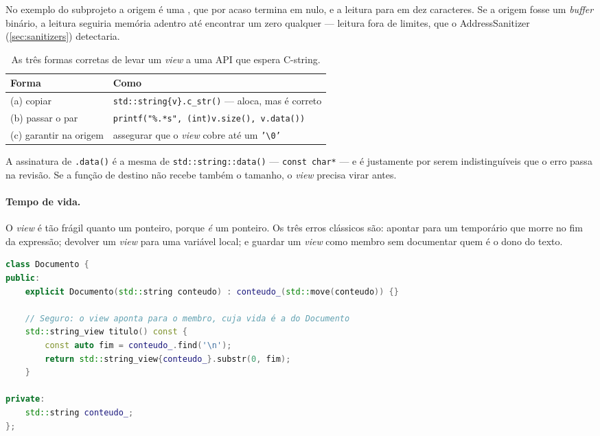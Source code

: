 No exemplo do subprojeto a origem é uma , que por acaso
termina em nulo, e a leitura para em dez caracteres. Se a origem fosse um
\emph{buffer} binário, a leitura seguiria memória adentro até encontrar um zero
qualquer --- leitura fora de limites, que o AddressSanitizer
(\cref{sec:sanitizers}) detectaria.

\begin{table}[htbp]
\centering
\caption{As três formas corretas de levar um \emph{view} a uma API que espera
         C-string.}
\label{tab:view-c-api}
\footnotesize
\begin{tabular}{@{}ll@{}}
\toprule
\textbf{Forma} & \textbf{Como} \\
\midrule
(a) copiar        & \texttt{std::string\{v\}.c\_str()} --- aloca, mas é correto \\
(b) passar o par  & \texttt{printf("\%.*s", (int)v.size(), v.data())} \\
(c) garantir na origem & assegurar que o \emph{view} cobre até um
                         \texttt{'\textbackslash 0'} \\
\bottomrule
\end{tabular}
\end{table}

\begin{regra}
A assinatura de \texttt{.data()} é a mesma de \texttt{std::string::data()} ---
\texttt{const char*} --- e é justamente por serem indistinguíveis que o erro
passa na revisão. Se a função de destino não recebe também o tamanho, o
\emph{view} precisa virar  antes.
\end{regra}

\paragraph{Tempo de vida.} O \emph{view} é tão frágil quanto um ponteiro, porque
\emph{é} um ponteiro. Os três erros clássicos são: apontar para um temporário
que morre no fim da expressão; devolver um \emph{view} para uma variável local;
e guardar um \emph{view} como membro sem documentar quem é o dono do texto.

\begin{lstlisting}[style=bt, language=C++,
    caption={O caso seguro em \texttt{src/strings/demo\_string\_view.hpp}: o
             \emph{view} aponta para um membro.}]
class Documento {
public:
    explicit Documento(std::string conteudo) : conteudo_(std::move(conteudo)) {}

    // Seguro: o view aponta para o membro, cuja vida é a do Documento
    std::string_view titulo() const {
        const auto fim = conteudo_.find('\n');
        return std::string_view{conteudo_}.substr(0, fim);
    }

private:
    std::string conteudo_;
};
\end{lstlisting}

